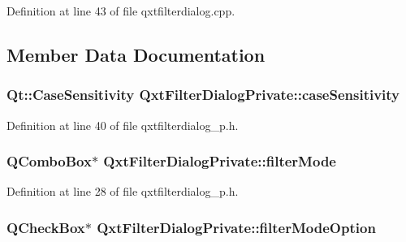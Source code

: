 Definition at line 43 of file qxtfilterdialog.\-cpp.



\subsection{Member Data Documentation}
\hypertarget{class_qxt_filter_dialog_private_a3be71668706b97a9d69292fe4b944b61}{
\subsubsection[{case\-Sensitivity}]{\setlength{\rightskip}{0pt plus 5cm}Qt\-::\-Case\-Sensitivity Qxt\-Filter\-Dialog\-Private\-::case\-Sensitivity}}\label{class_qxt_filter_dialog_private_a3be71668706b97a9d69292fe4b944b61}


Definition at line 40 of file qxtfilterdialog\-\_\-p.\-h.

\hypertarget{class_qxt_filter_dialog_private_a8061d12ff457098a210fe833dcf5e61f}{
\subsubsection[{filter\-Mode}]{\setlength{\rightskip}{0pt plus 5cm}Q\-Combo\-Box$\ast$ Qxt\-Filter\-Dialog\-Private\-::filter\-Mode}}\label{class_qxt_filter_dialog_private_a8061d12ff457098a210fe833dcf5e61f}


Definition at line 28 of file qxtfilterdialog\-\_\-p.\-h.

\hypertarget{class_qxt_filter_dialog_private_a8a655a17bdba57a7231278803a371811}{
\subsubsection[{filter\-Mode\-Option}]{\setlength{\rightskip}{0pt plus 5cm}Q\-Check\-Box$\ast$ Qxt\-Filter\-Dialog\-Private\-::filter\-Mode\-Option}}\label{class_qxt_filter_dialog_private_a8a655a17bdba57a7231278803a371811}


